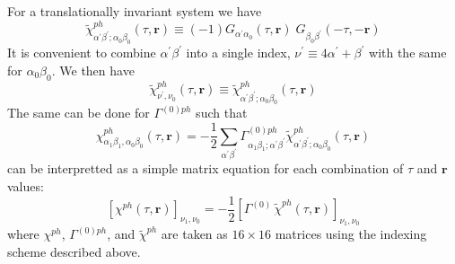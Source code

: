 For a translationally invariant system we have
\begin{equation}
\tilde{\chi}^{ph}_{\alpha^{\prime}\beta^{\prime}; 
\alpha_0 \beta_0}(\tau,\mathbf{r}) \equiv
(-1) G_{\alpha^{\prime} \alpha_0}(\tau,\mathbf{r}) \; 
G_{\beta_0 \beta^{\prime}}(-\tau,-\mathbf{r})
\end{equation}
It is convenient to combine $\alpha^{\prime}\beta^{\prime}$
into a single index, $\nu^{\prime} \equiv
4 \alpha^{\prime} + \beta^{\prime}$ with the same
for $\alpha_0\beta_0$.  We then have
\begin{equation}
\tilde{\chi}^{ph}_{\nu^{\prime},\nu_0}(\tau,\mathbf{r}) \equiv
\tilde{\chi}^{ph}_{\alpha^{\prime}\beta^{\prime}; 
\alpha_0 \beta_0}(\tau,\mathbf{r})
\end{equation}
The same can be done for $\Gamma^{(0)ph}$ such that
\begin{equation}
\chi^{ph}_{\alpha_1\beta_1,\alpha_0\beta_0}(\tau,\mathbf{r}) 
=-\frac{1}{2} \sum_{\alpha^{\prime}\beta^{\prime}} 
\Gamma^{(0)ph}_{\alpha_1\beta_1;\alpha^{\prime}\beta^{\prime}}
\tilde{\chi}^{ph}_{\alpha^{\prime}\beta^{\prime};\alpha_0\beta_0}
(\tau,\mathbf{r})
\end{equation}
can be interpretted as a simple matrix equation for each combination
of $\tau$ and $\mathbf{r}$ values:
\begin{equation}
\left[\chi^{ph}(\tau,\mathbf{r})\right]_{\nu_1,\nu_0} =
-\frac{1}{2}\left[\Gamma^{(0)}\,\tilde{\chi}^{ph}(\tau,\mathbf{r})\right]_{\nu_1,\nu_0}
\end{equation}
where $\chi^{ph}$, $\Gamma^{(0)ph}$, and $\tilde{\chi}^{ph}$
are taken as $16 \times 16$ matrices using the indexing scheme
described above.

